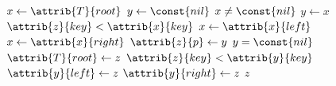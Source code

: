 \begin{codebox}
\li $x \gets \attrib{T}{root}$
\li $y \gets \const{nil}$
\li \While $x \neq \const{nil}$
\li \Do
        $y \gets x$
\li     \If $\attrib{z}{key} < \attrib{x}{key}$
\li     \Then
            $x \gets \attrib{x}{left}$
\li     \Else
\li         $x \gets \attrib{x}{right}$
        \End
    \End
\li $\attrib{z}{p} \gets y$
\li \If $y = \const{nil}$
\li \Then
        $\attrib{T}{root} \gets z$
\li \Else 
\li     \If $\attrib{z}{key} < \attrib{y}{key}$
\li     \Then
            $\attrib{y}{left} \gets z$
\li     \Else
\li         $\attrib{y}{right} \gets z$
        \End
    \End
\li \Return $z$
\end{codebox}